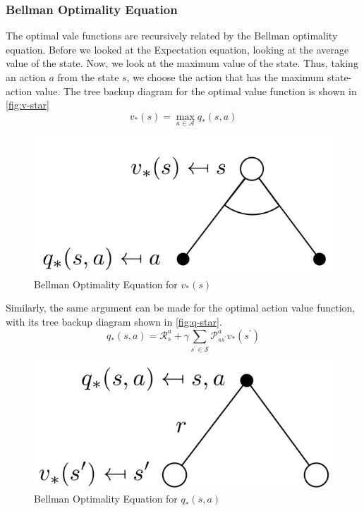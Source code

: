 \subsubsection{Bellman Optimality Equation}
The optimal vale functions are recursively related by the Bellman
optimality equation.
Before we looked at the Expectation equation, looking at the average
value of the state. Now, we look at the maximum value of the state. 
Thus, taking an action \(a\) from the state \(s\), we choose the action
that has the maximum state-action value. The tree backup diagram for the
optimal value function is shown in \autoref{fig:v-star}
\[
    v_{*} (s) = \max_{a \in \mathcal{A} } q_{*} (s, a)  
\] 
\begin{figure}[H]
    \centering
    \includegraphics[width=0.5\linewidth]{figures/v-star.png}
    \caption{Bellman Optimality Equation for \(v_{*} (s)\)}
    \label{fig:v-star}
\end{figure}

Similarly, the same argument can be made for the optimal action value function,
with its tree backup diagram shown in \autoref{fig:q-star}.
\[
    q_{*} (s, a) = \mathcal{R} _{s}^{a} + \gamma \sum_{s^{\prime} \in \mathcal{S} } \mathcal{P} _{ss^{\prime}}^{a} v_{*} (s^{\prime} )
\]
\begin{figure}[H]
    \centering
    \includegraphics[width=0.5\linewidth]{figures/q-star.png}
    \caption{Bellman Optimality Equation for \(q_{*} (s, a)\)}
    \label{fig:q-star}
\end{figure}

